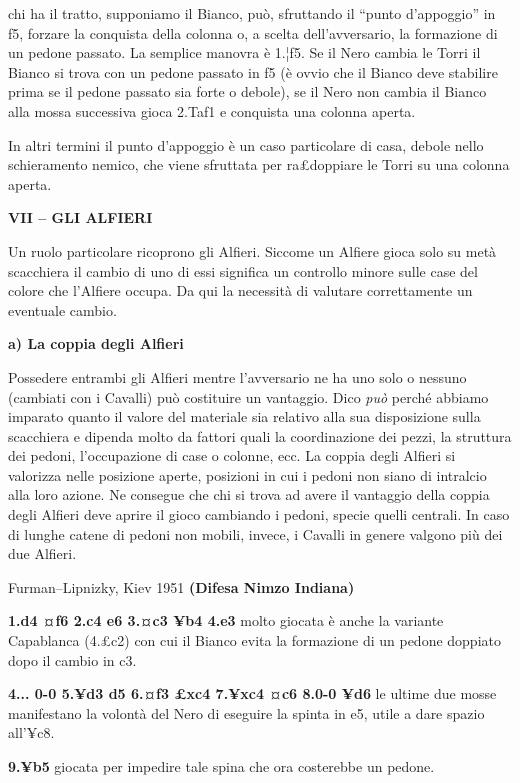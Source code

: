 \documentclass[
]{article}
\begin{document}
chi ha il tratto, supponiamo il Bianco, può, sfruttando il ``punto
d'appoggio'' in f5, forzare la conquista della colonna o, a scelta
dell'avversario, la formazione di un pedone passato. La semplice manovra
è 1.¦f5. Se il Nero cambia le Torri il Bianco si trova con un pedone
passato in f5 (è ovvio che il Bianco deve stabilire prima se il pedone
passato sia forte o debole), se il Nero non cambia il Bianco alla mossa
successiva gioca 2.Taf1 e conquista una colonna aperta.

In altri termini il punto d'appoggio è un caso particolare di casa,
debole nello schieramento nemico, che viene sfruttata per ra£doppiare le
Torri su una colonna aperta.

\textbf{VII -- GLI ALFIERI}

Un ruolo particolare ricoprono gli Alfieri. Siccome un Alfiere gioca
solo su metà scacchiera il cambio di uno di essi significa un controllo
minore sulle case del colore che l'Alfiere occupa. Da qui la necessità
di valutare correttamente un eventuale cambio.

\textbf{a) La coppia degli Alfieri}

Possedere entrambi gli Alfieri mentre l'avversario ne ha uno solo o
nessuno (cambiati con i Cavalli) può costituire un vantaggio. Dico
\emph{può} perché abbiamo imparato quanto il valore del materiale sia
relativo alla sua disposizione sulla scacchiera e dipenda molto da
fattori quali la coordinazione dei pezzi, la struttura dei pedoni,
l'occupazione di case o colonne, ecc. La coppia degli Alfieri si
valorizza nelle posizione aperte, posizioni in cui i pedoni non siano di
intralcio alla loro azione. Ne consegue che chi si trova ad avere il
vantaggio della coppia degli Alfieri deve aprire il gioco cambiando i
pedoni, specie quelli centrali. In caso di lunghe catene di pedoni non
mobili, invece, i Cavalli in genere valgono più dei due Alfieri.

Furman--Lipnizky, Kiev 1951 \textbf{(Difesa Nimzo Indiana)}

\textbf{1.d4 ¤f6 2.c4 e6 3.¤c3 ¥b4 4.e3} molto giocata è anche la
variante Capablanca (4.£c2) con cui il Bianco evita la formazione di un
pedone doppiato dopo il cambio in c3.

\textbf{4... 0-0 5.¥d3 d5 6.¤f3 £xc4 7.¥xc4 ¤c6 8.0-0 ¥d6} le ultime due
mosse manifestano la volontà del Nero di eseguire la spinta in e5, utile
a dare spazio all'¥c8.

\textbf{9.¥b5} giocata per impedire tale spina che ora costerebbe un
pedone.
\end{document}
